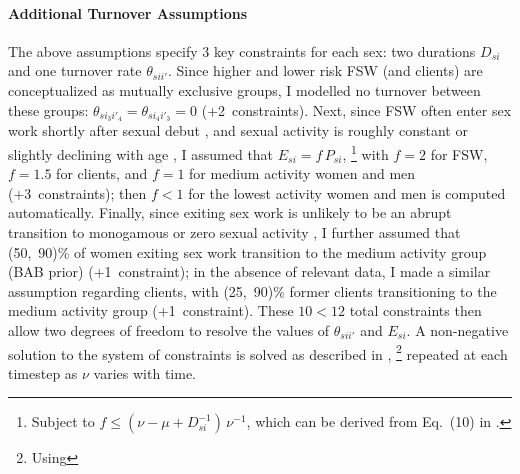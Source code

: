 \paragraph{Additional Turnover Assumptions}
The above assumptions specify 3 key constraints for each sex:
two durations $D_{si}$ and one turnover rate $\theta_{sii'}$.
Since higher and lower risk FSW (and clients) are conceptualized as mutually exclusive groups,
I modelled no turnover between these groups:
$\theta_{si_{3}i'_{4}} = \theta_{si_{4}i'_{3}} = 0$ (+2~constraints).
Next, since FSW often enter sex work shortly after sexual debut \cite{Cheuk2020,Ma2020},
and sexual activity is roughly constant or slightly declining with age \cite{Todd2009},
I assumed that $E_{si} = f\,P_{si}$,%
\footnote{Subject to $f \le (\nu - \mu + D_{si}^{-1})\,\nu^{-1}$,
  which can be derived from Eq.~(10) in \cite{Knight2020}.}
with $f = 2$ for FSW, $f = 1.5$ for clients,
and $f = 1$ for medium activity women and men (+3~constraints);
then $f < 1$ for the lowest activity women and men is computed automatically.
Finally, since exiting sex work is unlikely to be
an abrupt transition to monogamous or zero sexual activity \cite{Scorgie2012,Learmonth2015},
I further assumed that (50,~90)\% of women exiting sex work
transition to the medium activity group (BAB prior) (+1~constraint);
in the absence of relevant data, I made a similar assumption regarding clients,
with (25,~90)\% former clients transitioning to the medium activity group (+1~constraint).
These $10 < 12$ total constraints then allow two degrees of freedom to resolve
the values of $\theta_{sii'}$ and $E_{si}$.
A non-negative solution to the system of constraints is solved as described in \cite{Knight2020},%
\footnote{Using }
repeated at each timestep as $\nu$ varies with time.
